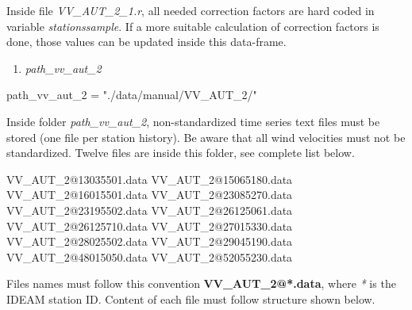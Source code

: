 \documentclass[12pt,twoside]{reedthesis}
\newenvironment{Shaded}{\begin{snugshade}}{\end{snugshade}}
\newcommand{\DecValTok}[1]{\textcolor[rgb]{0.00,0.00,0.81}{#1}}
\newcommand{\ExtensionTok}[1]{#1}
\newcommand{\NormalTok}[1]{#1}
\newcommand{\StringTok}[1]{\textcolor[rgb]{0.31,0.60,0.02}{#1}}
\providecommand{\tightlist}{%
  \setlength{\itemsep}{0pt}\setlength{\parskip}{0pt}}
\begin{document}
Inside file \emph{VV\_AUT\_2\_1.r}, all needed correction factors are hard coded in variable \emph{stationssample}. If a more suitable calculation of correction factors is done, those values can be updated inside this data-frame.
\begin{enumerate}
\def\labelenumi{\arabic{enumi}.}
\setcounter{enumi}{1}
\tightlist
\item
  \emph{path\_vv\_aut\_2}
\end{enumerate}
\scriptsize

\vspace{0.4cm}
\begin{Shaded}
\begin{Highlighting}[]
\NormalTok{      path_vv_aut_}\DecValTok{2}\NormalTok{ =}\StringTok{ "./data/manual/VV_AUT_2/"}
\end{Highlighting}
\end{Shaded}
\normalsize

Inside folder \emph{path\_vv\_aut\_2}, non-standardized time series text files must be stored (one file per station history). Be aware that all wind velocities must not be standardized. Twelve files are inside this folder, see complete list below.

\scriptsize

\vspace{0.4cm}
\begin{Shaded}
\begin{Highlighting}[]
      \ExtensionTok{VV_AUT_2@13035501.data}
      \ExtensionTok{VV_AUT_2@15065180.data}
      \ExtensionTok{VV_AUT_2@16015501.data}
      \ExtensionTok{VV_AUT_2@23085270.data}
      \ExtensionTok{VV_AUT_2@23195502.data}
      \ExtensionTok{VV_AUT_2@26125061.data}
      \ExtensionTok{VV_AUT_2@26125710.data}
      \ExtensionTok{VV_AUT_2@27015330.data}
      \ExtensionTok{VV_AUT_2@28025502.data}
      \ExtensionTok{VV_AUT_2@29045190.data}
      \ExtensionTok{VV_AUT_2@48015050.data}
      \ExtensionTok{VV_AUT_2@52055230.data}
\end{Highlighting}
\end{Shaded}
\normalsize

Files names must follow this convention \textbf{VV\_AUT\_2@*.data}, where \emph{*} is the IDEAM station ID. Content of each file must follow structure shown below.

\scriptsize
\end{document}
